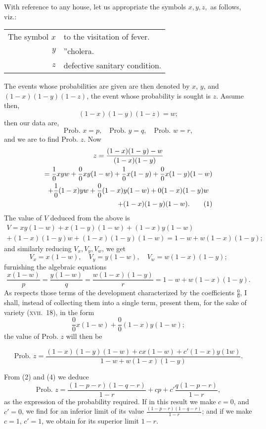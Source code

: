 \documentclass[oneside]{book}
\begin{document}
With reference to any house, let us appropriate the symbols
$x, y, z,$ as follows, viz.:

\begin{tabular}{rl}
  The symbol $x$& to the visitation of fever.\\
             $y$&\hfill ''\hfill cholera. \\
             $z$& defective sanitary condition.
\end{tabular}

The events whose probabilities are given are then denoted by
$x$, $y$, and $(1-x)(1-y)(1-z)$, the event whose probability is
sought is $z$. Assume then,
\[
(1-x)(1-y)(1-z) = w;
\]
then our data are,
\[
\text{Prob. } x = p,\quad \text{Prob. } y = q,\quad \text{Prob. } w = r,
\]
and we are to find Prob. $z$. Now
\begin{multline}
z = \frac{(1-x)(1-y)-w}{(1-x)(1-y)} \\
= \frac{1}{0}xyw + \frac{0}{0}xy(1-w) + \frac{1}{0}x(1-y) + \frac{0}{0}x(1-y)(1-w) \\
+ \frac{1}{0}(1-x)yw + \frac{0}{0}(1-x)y(1-w) + 0(1-x)(1-y)w \\
\hfill + (1-x)(1-y)(1-w). \tag{1}
\end{multline}
The value of $V$ deduced from the above is
\[
\begin{array}{c}
V = xy(1-w) + x(1-y)(1-w) + (1-x)y(1-w) \\
+ (1-x)(1-y)w + (1-x)(1-y)(1-w) = 1-w+w(1-x)(1-y);
\end{array}
\]
and similarly reducing $V_x, V_y, V_w$, we get
\[
V_x = x(1-w),\quad V_y = y(1-w), \quad V_w = w(1-x)(1-y);
\]
furnishing the algebraic equations
\[
\frac{x(1-w)}{p} = \frac{y(1-w)}{q} = \frac{w(1-x)(1-y)}{r} = 1 - w + w(1-x)(1-y). \tag{2}
\]
As respects those terms of the development characterized by
the coefficients $\frac{0}{0}$, I shall, instead of collecting them into a single
term, present them, for the sake of variety (\textsc{xvii.}~18), in the
form
\[
\frac{0}{0}x(1-w) + \frac{0}{0}(1-x)y(1-w); \tag{3}
\]
the value of Prob. $z$ will then be


\[
  \textrm{Prob. }z = \frac{(1-x)(1-y)(1-w) + cx(1-w) + c'(1-x)y(1w)}
                        {1 - w + w(1 - x)(1 - y)}. \tag{4}
\]

From (2) and (4) we deduce
\[
  \text{Prob. }z = \frac{(1-p-r)(1-q-r)}{1-r}
+ cp + c'\frac{q(1-p-r)}{1-r},
\]
as the expression of the probability required. If in this result
we make $c = 0$, and $c' = 0$, we find for an inferior limit of its value
$\frac{(1-p-r)(1-q-r)}{1-r}$; and if we make $c=1$, $c'=1$, we obtain
for its superior limit $1-r$.
\end{document}
